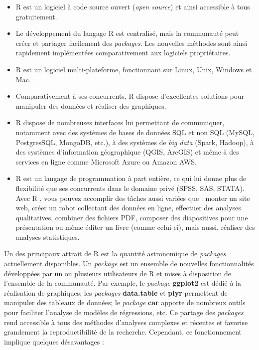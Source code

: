 \documentclass[
  11pt,
  french,
]{book}
\providecommand{\tightlist}{%
  \setlength{\itemsep}{0pt}\setlength{\parskip}{0pt}}
\begin{document}
\begin{itemize}
\tightlist
\item
  R est un logiciel à code source ouvert (\emph{open source}) et ainsi accessible à tous gratuitement.
\item
  Le développement du langage R est centralisé, mais la communauté peut créer et partager facilement des \emph{packages}. Les nouvelles méthodes sont ainsi rapidement implémentées comparativement aux logiciels propriétaires.
\item
  R est un logiciel multi-plateforme, fonctionnant sur Linux, Unix, Windows et Mac.
\item
  Comparativement à ses concurrents, R dispose d'excellentes solutions pour manipuler des données et réaliser des graphiques.
\item
  R dispose de nombreuses interfaces lui permettant de communiquer, notamment avec des systèmes de bases de données SQL et non SQL (MySQL, PostgresSQL, MongoDB, etc.), à des systèmes de \emph{big data} (Spark, Hadoop), à des systèmes d'information géographique (QGIS, ArcGIS) et même à des services en ligne comme Microsoft Azure ou Amazon AWS.
\item
  R est un langage de programmation à part entière, ce qui lui donne plus de flexibilité que ses concurrents dans le domaine privé (SPSS, SAS, STATA). Avec R , vous pouvez accomplir des tâches aussi variées que : monter un site web, créer un robot collectant des données en ligne, effectuer des analyses qualitatives, combiner des fichiers PDF, composer des diapositives pour une présentation ou même éditer un livre (comme celui-ci), mais aussi, réaliser des analyses statistiques.
\end{itemize}

Un des principaux attrait de R est la quantité astronomique de \emph{packages} actuellement disponibles. Un \emph{package} est un ensemble de nouvelles fonctionnalités développées par un ou plusieurs utilisateurs de R et mises à disposition de l'ensemble de la communauté. Par exemple, le \emph{package} \textbf{ggplot2} est dédié à la réalisation de graphiques; les \emph{packages} \textbf{data.table} et \textbf{plyr} permettent de manipuler des tableaux de données; le \emph{package} \textbf{car} apporte de nombreux outils pour faciliter l'analyse de modèles de régressions, etc. Ce partage des \emph{packages} rend accessible à tous des méthodes d'analyses complexes et récentes et favorise grandement la reproductibilité de la recherche. Cependant, ce fonctionnement implique quelques désavantages :
\end{document}
